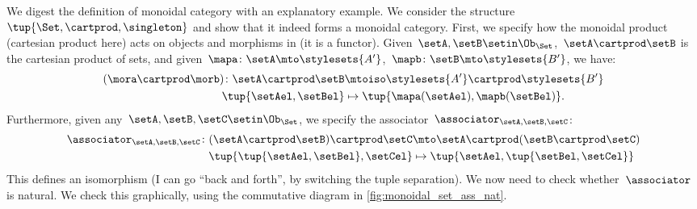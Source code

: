
\begin{example}
    We digest the definition of monoidal category with an explanatory example.
    We consider the structure~$\tup{\Set,\cartprod,\singleton}$ and show that it indeed forms a monoidal category.
    First, we specify how the monoidal product (cartesian product here) acts on objects and morphisms in \Set (it is a functor).
    Given~$\setA,\setB\setin \Ob_{\Set}$,~$\setA\cartprod \setB$ is the cartesian product of sets, and given~$\mapa\colon \setA\mto \stylesets{A'}$,~$\mapb\colon \setB\mto \stylesets{B'}$, we have:
    \begin{equation}
        \label{eq:set_mon_prod_2}
        \begin{aligned}
            (\mora \cartprod \morb)
            \colon \setA\cartprod \setB & \mtoiso \stylesets{A'}\cartprod \stylesets{B'} \\
            \tup{\setAel,\setBel}       & \mapsto \tup{\mapa(\setAel),\mapb(\setBel)}.
        \end{aligned}
    \end{equation}
    Furthermore, given any~$\setA,\setB,\setC\setin \Ob_{\Set}$, we specify the associator~$\associator_{\setA,\setB,\setC}$:
    \begin{equation}
        \label{eq:set_mon_prod_3}
        \begin{aligned}
            \associator_{\setA,\setB,\setC}\colon (\setA\cartprod \setB)\cartprod \setC & \mto \setA\cartprod (\setB\cartprod \setC) \\
            \tup{\tup{\setAel,\setBel},\setCel}                                         & \mapsto \tup{\setAel,\tup{\setBel,\setCel}}
        \end{aligned}
    \end{equation}
    This defines an isomorphism (I can go ``back and forth'', by switching the tuple separation).
    We now need to check whether~$\associator$ is natural.
    We check this graphically, using the commutative diagram in \cref{fig:monoidal_set_ass_nat}.


\end{example}
